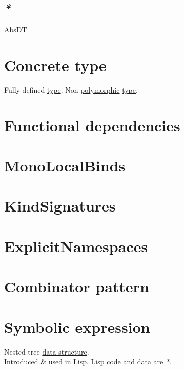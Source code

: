 \documentclass[a4paper,14pt,oneside]{book}
\begin{document}
\section{\emph{*}}
\label{sec:orgadc6a82}

\label{orgd55d4c4}AbsDT\\

\chapter{\label{orga7cddac}Concrete type}
\label{sec:org92197cb}
Fully defined \hyperref[org35b9249]{type}. Non-\hyperref[orga6475c9]{polymorphic} \hyperref[org35b9249]{type}.\\

\chapter{\label{orgedf069f}Functional dependencies}
\label{sec:orgfea992d}

\chapter{\label{orgaf573fe}MonoLocalBinds}
\label{sec:org6e42761}

\chapter{\label{org8de3c70}KindSignatures}
\label{sec:org9d4700b}

\chapter{\label{org5333170}ExplicitNamespaces}
\label{sec:org0fdd93e}

\chapter{\label{org9c07c80}Combinator pattern}
\label{sec:orgafe8911}

\chapter{\label{org109b4b7}Symbolic expression}
\label{sec:orgf073188}
Nested tree \hyperref[org8b4a18b]{data structure}.\\

Introduced \& used in Lisp. Lisp code and data are \emph{*}.\\
\end{document}
